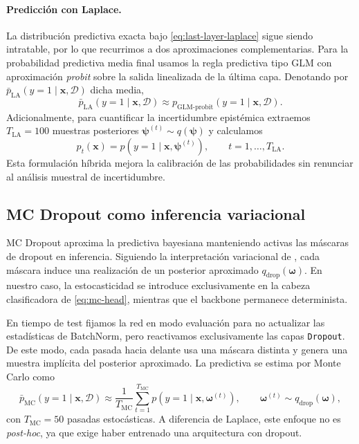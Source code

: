 \documentclass{article}
\begin{document}
\paragraph{Predicci\'on con Laplace.}
La distribuci\'on predictiva exacta bajo \eqref{eq:last-layer-laplace}
sigue siendo intratable, por lo que recurrimos a dos aproximaciones
complementarias. Para la probabilidad predictiva media final usamos la
regla predictiva tipo GLM con aproximaci\'on \emph{probit} sobre la
salida linealizada de la \'ultima capa. Denotando por
\(\bar p_{\mathrm{LA}}(y=1\mid \mathbf{x},\mathcal{D})\) dicha media,
\begin{equation}
\bar p_{\mathrm{LA}}(y=1\mid \mathbf{x},\mathcal{D})
\approx
p_{\mathrm{GLM\text{-}probit}}(y=1\mid \mathbf{x},\mathcal{D}).
\label{eq:laplace-glm}
\end{equation}
Adicionalmente, para cuantificar la incertidumbre epist\'emica extraemos
\(T_{\mathrm{LA}}=100\) muestras posteriores
\(\boldsymbol{\psi}^{(t)}\sim q(\boldsymbol{\psi})\) y calculamos
\begin{equation}
p_t(\mathbf{x})
=
p\!\left(y=1\mid \mathbf{x},\boldsymbol{\psi}^{(t)}\right),
\qquad
t=1,\dots,T_{\mathrm{LA}}.
\label{eq:laplace-samples}
\end{equation}
Esta formulaci\'on h\'ibrida mejora la calibraci\'on de las
probabilidades sin renunciar al an\'alisis muestral de incertidumbre.

\subsection{MC Dropout como inferencia variacional}
\label{sec:mcdropout-method}

MC Dropout aproxima la predictiva bayesiana manteniendo activas las
m\'ascaras de dropout en inferencia. Siguiendo la interpretaci\'on
variacional de \citet{gal2016dropout}, cada m\'ascara induce una
realizaci\'on de un posterior aproximado
\(q_{\mathrm{drop}}(\boldsymbol{\omega})\). En nuestro caso, la
estocasticidad se introduce exclusivamente en la cabeza clasificadora de
\eqref{eq:mc-head}, mientras que el backbone permanece determinista.

En tiempo de test fijamos la red en modo evaluaci\'on para no actualizar
las estad\'isticas de BatchNorm, pero reactivamos exclusivamente las
capas \texttt{Dropout}. De este modo, cada pasada hacia delante usa una
m\'ascara distinta y genera una muestra impl\'icita del posterior
aproximado. La predictiva se estima por Monte Carlo como
\begin{equation}
\bar p_{\mathrm{MC}}(y=1\mid \mathbf{x},\mathcal{D})
\approx
\frac{1}{T_{\mathrm{MC}}}
\sum_{t=1}^{T_{\mathrm{MC}}}
p\!\left(y=1\mid \mathbf{x},\boldsymbol{\omega}^{(t)}\right),
\qquad
\boldsymbol{\omega}^{(t)}\sim q_{\mathrm{drop}}(\boldsymbol{\omega}),
\label{eq:mc-predictive}
\end{equation}
con \(T_{\mathrm{MC}}=50\) pasadas estoc\'asticas. A diferencia de
Laplace, este enfoque no es \emph{post-hoc}, ya que exige haber
entrenado una arquitectura con dropout.
\end{document}
